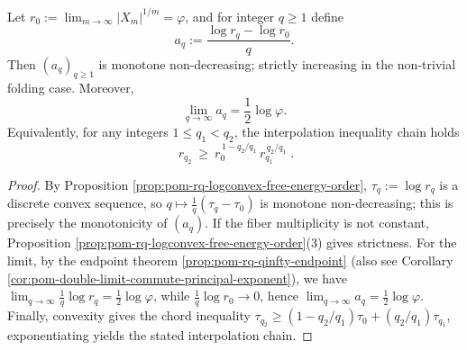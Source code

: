 \begin{corollary}[Ground State Normalized Convex Order: Free Energy Defect Slope Monotonicity with \texorpdfstring{$r_0=\varphi$}{r0=phi} as Baseline]\label{cor:pom-rq-groundstate-normalized-slope}
Let
\(
r_0:=\lim_{m\to\infty}|X_m|^{1/m}=\varphi
\),
and for integer \(q\ge 1\) define
\[
a_q:=\frac{\log r_q-\log r_0}{q}.
\]
Then \((a_q)_{q\ge 1}\) is monotone non-decreasing; strictly increasing in the non-trivial folding case.
Moreover,
\[
\lim_{q\to\infty}a_q=\frac12\log\varphi.
\]
Equivalently, for any integers \(1\le q_1<q_2\), the interpolation inequality chain holds
\[
\boxed{\;
r_{q_2}\ \ge\ r_0^{\,1-q_2/q_1}\,r_{q_1}^{\,q_2/q_1}\; }.
\]
\end{corollary}
\begin{proof}
By Proposition \ref{prop:pom-rq-logconvex-free-energy-order}, \(\tau_q:=\log r_q\) is a discrete convex sequence, so \(q\mapsto \frac{1}{q}(\tau_q-\tau_0)\) is monotone non-decreasing; this is precisely the monotonicity of \((a_q)\).
If the fiber multiplicity is not constant, Proposition \ref{prop:pom-rq-logconvex-free-energy-order}(3) gives strictness.
For the limit, by the endpoint theorem \ref{prop:pom-rq-qinfty-endpoint} (also see Corollary \ref{cor:pom-double-limit-commute-principal-exponent}), we have \(\lim_{q\to\infty}\frac{1}{q}\log r_q=\frac12\log\varphi\), while \(\frac{1}{q}\log r_0\to 0\), hence \(\lim_{q\to\infty}a_q=\frac12\log\varphi\).
Finally, convexity gives the chord inequality
\(
\tau_{q_2}\ge (1-q_2/q_1)\tau_0+(q_2/q_1)\tau_{q_1}
\),
exponentiating yields the stated interpolation chain.
\end{proof}
